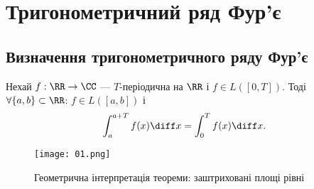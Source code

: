 \section{Тригонометричний ряд Фур'є}

\subsection{Визначення тригонометричного ряду Фур'є}

\begin{theorem}
    Нехай $f: \RR \to \CC$ --- $T$-періодична на $\RR$ і $f \in L([0, T])$. Тоді $\forall \{a, b\} \subset \RR$: $f \in L([a, b])$ і 
    \begin{equation}
        \int_a^{a + T} f(x) \diff x = \int_0^T f(x) \diff x.
    \end{equation}
\end{theorem}

\begin{figure}[H]
    \centering
    \texttt{[image: 01.png]}
    \caption{Геометрична інтерпретація теореми: заштриховані площі рівні}
\end{figure}

